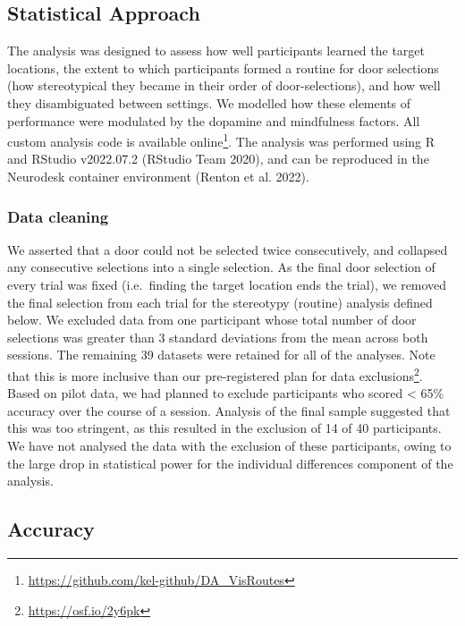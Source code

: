 \documentclass{article}
\begin{document}
\hypertarget{statistical-approach}{%
\subsection{Statistical Approach}\label{statistical-approach}}

The analysis was designed to assess how well participants learned the
target locations, the extent to which participants formed a routine for
door selections (how stereotypical they became in their order of
door-selections), and how well they disambiguated between settings. We
modelled how these elements of performance were modulated by the
dopamine and mindfulness factors. All custom analysis code is available
online\footnote{\url{https://github.com/kel-github/DA_VisRoutes}}. The
analysis was performed using R and RStudio v2022.07.2 (RStudio Team
2020), and can be reproduced in the Neurodesk container environment
(Renton et al. 2022).

\hypertarget{data-cleaning}{%
\subsubsection{Data cleaning}\label{data-cleaning}}

We asserted that a door could not be selected twice consecutively, and
collapsed any consecutive selections into a single selection. As the
final door selection of every trial was fixed (i.e.~finding the target
location ends the trial), we removed the final selection from each trial
for the stereotypy (routine) analysis defined below. We excluded data
from one participant whose total number of door selections was greater
than 3 standard deviations from the mean across both sessions. The
remaining 39 datasets were retained for all of the analyses. Note that
this is more inclusive than our pre-registered plan for data
exclusions\footnote{\url{https://osf.io/2y6pk}}. Based on pilot data, we
had planned to exclude participants who scored \textless{} 65\% accuracy
over the course of a session. Analysis of the final sample suggested
that this was too stringent, as this resulted in the exclusion of 14 of
40 participants. We have not analysed the data with the exclusion of
these participants, owing to the large drop in statistical power for the
individual differences component of the analysis.

\hypertarget{accuracy}{%
\subsection{Accuracy}\label{accuracy}}
\end{document}
